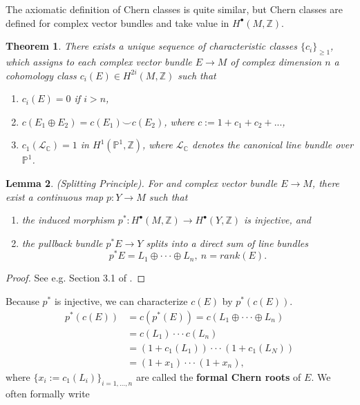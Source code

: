 \documentclass[11pt]{article}
\newtheorem{thm}{Theorem}[section]
\newtheorem{lemma}[thm]{Lemma}
\newcommand{\cplx}{\mathbb C}
\newcommand{\intg}{\mathbb Z}
\begin{document}
	The axiomatic definition of Chern classes is quite similar, but Chern classes are defined for complex vector bundles and take value in $H^\bullet(M,\intg)$.
	\begin{thm}
	There exists a unique sequence of characteristic classes $\{c_i\}_{\geq1}$, which assigns to each complex vector bundle $E\rightarrow M$ of complex dimension $n$ a cohomology class
	 $c_i(E)\in H^{2i}(M,\intg)$ such that
	\begin{enumerate}[label=(\alph*)]
	\item $c_i(E)=0$ if $i>n$,
	\item $c(E_1\oplus E_2)=c(E_1)\smile c(E_2)$, where $c:=1+c_1+c_2+...$,
	\item $c_1(\mathcal{L}_\cplx)=1$ in $H^1( \mathbb{P}^1,\intg)$, where $\mathcal{L}_\cplx$ denotes the canonical line bundle over $\mathbb{P}^1$. 
	\end{enumerate}
	\end{thm}
	\begin{lemma}
	(Splitting Principle). For and complex vector bundle $E\rightarrow M$, there exist a continuous map $p: Y\rightarrow M$ such that
	\begin{enumerate}[label=(\alph*)]
	\item the induced morphism $p^*:H^\bullet(M,\intg)\rightarrow H^\bullet(Y,\intg)$ is injective, and
	\item the pullback bundle $p^*E\rightarrow Y$ splits into a direct sum of line bundles
		\begin{equation*}
			p^*E=L_1\oplus\cdot\cdot\cdot\oplus L_n,\ n=rank(E).
		\end{equation*}
	\end{enumerate}
	\end{lemma}
	\begin{proof}
	See e.g. Section 3.1 of \cite{hatcher2003vector}.
	\end{proof}
	Because $p^*$ is injective, we can characterize $c(E)$ by $p^*(c(E))$.
	\begin{equation*}
	\begin{aligned}
		p^*(c(E)) & =c(p^*(E))=c(L_1\oplus\cdot\cdot\cdot\oplus L_n)\\
				  & =c(L_1)\cdot\cdot\cdot c(L_n)\\
				  & =(1+c_1(L_1))\cdot\cdot\cdot(1+c_1(L_N))\\
				  & =(1+x_1)\cdot\cdot\cdot(1+x_n),
	\end{aligned}
	\end{equation*}
	where $\{x_i:=c_1(L_i)\}_{i=1,...,n}$ are called the \textbf{formal Chern roots} of $E$. We often formally write
\end{document}
